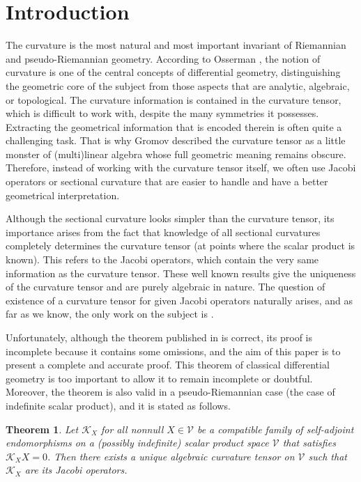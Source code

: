\documentclass[preprint]{elsarticle}
\newtheorem{theorem}{Theorem}%
\newcommand\mc{\mathcal}
\begin{document}
\section{Introduction}

The curvature is the most natural and most important invariant of Riemannian and pseudo-Riemannian geometry.
According to Osserman \cite{O}, the notion of curvature is one of the central concepts of differential geometry, 
distinguishing the geometric core of the subject from those aspects that are analytic, algebraic, or topological.
The curvature information is contained in the curvature tensor, which is difficult to work with, despite the many symmetries it possesses.
Extracting the geometrical information that is encoded therein is often quite a challenging task.
That is why Gromov \cite{Gro} described the curvature tensor as a little monster of (multi)linear algebra whose full geometric meaning remains obscure.
Therefore, instead of working with the curvature tensor itself, we often use Jacobi operators or sectional curvature
that are easier to handle and have a better geometrical interpretation.

Although the sectional curvature looks simpler than the curvature tensor, its importance arises from the fact that
knowledge of all sectional curvatures completely determines the curvature tensor (at points where the scalar product is known).
This refers to the Jacobi operators, which contain the very same information as the curvature tensor.
These well known results give the uniqueness of the curvature tensor and are purely algebraic in nature.
The question of existence of a curvature tensor for given Jacobi operators naturally arises, 
and as far as we know, the only work on the subject is \cite{A9}. 

Unfortunately, although the theorem published in \cite[Theorem 1]{A9} is correct, 
its proof is incomplete because it contains some omissions, and the aim of this paper is to present a complete and accurate proof.
This theorem of classical differential geometry is too important to allow it to remain incomplete or doubtful.
Moreover, the theorem is also valid in a pseudo-Riemannian case (the case of indefinite scalar product), and it is stated as follows.

\begin{theorem}\label{jacobiex}
Let $\mc{K}_X$ for all nonnull $X\in\mc{V}$ be a compatible family of self-adjoint endomorphisms on 
a (possibly indefinite) scalar product space $\mc{V}$ that satisfies $\mc{K}_XX=0$.
Then there exists a unique algebraic curvature tensor on $\mc{V}$ such that $\mc{K}_X$ are its Jacobi operators.
\end{theorem}
\end{document}
